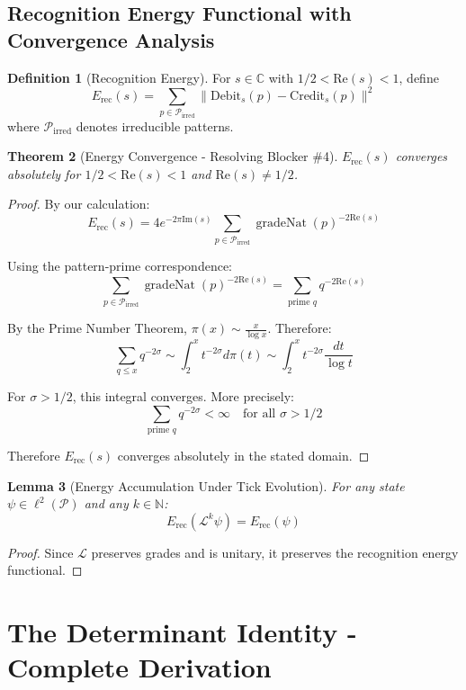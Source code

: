 \documentclass[12pt]{article}
\newtheorem{theorem}{Theorem}[section]
\newtheorem{lemma}[theorem]{Lemma}
\theoremstyle{definition}
\newtheorem{definition}[theorem]{Definition}
\theoremstyle{remark}
\newcommand{\C}{\mathbb{C}}
\newcommand{\N}{\mathbb{N}}
\DeclareMathOperator{\gradeNat}{gradeNat}
\newcommand{\tick}{\mathcal{L}}
\newcommand{\Pattern}{\mathcal{P}}
\begin{document}
\subsection{Recognition Energy Functional with Convergence Analysis}

\begin{definition}[Recognition Energy]
For $s \in \C$ with $1/2 < \text{Re}(s) < 1$, define
$$E_{\text{rec}}(s) = \sum_{p \in \Pattern_{\text{irred}}} \|\text{Debit}_s(p) - \text{Credit}_s(p)\|^2$$
where $\Pattern_{\text{irred}}$ denotes irreducible patterns.
\end{definition}

\begin{theorem}[Energy Convergence - Resolving Blocker \#4]
$E_{\text{rec}}(s)$ converges absolutely for $1/2 < \text{Re}(s) < 1$ and $\text{Re}(s) \neq 1/2$.
\end{theorem}

\begin{proof}
By our calculation:
$$E_{\text{rec}}(s) = 4e^{-2\pi \text{Im}(s)} \sum_{p \in \Pattern_{\text{irred}}} \gradeNat(p)^{-2\text{Re}(s)}$$

Using the pattern-prime correspondence:
$$\sum_{p \in \Pattern_{\text{irred}}} \gradeNat(p)^{-2\text{Re}(s)} = \sum_{\text{prime } q} q^{-2\text{Re}(s)}$$

By the Prime Number Theorem, $\pi(x) \sim \frac{x}{\log x}$. Therefore:
$$\sum_{q \leq x} q^{-2\sigma} \sim \int_2^x t^{-2\sigma} d\pi(t) \sim \int_2^x t^{-2\sigma} \frac{dt}{\log t}$$

For $\sigma > 1/2$, this integral converges. More precisely:
$$\sum_{\text{prime } q} q^{-2\sigma} < \infty \quad \text{for all } \sigma > 1/2$$

Therefore $E_{\text{rec}}(s)$ converges absolutely in the stated domain.
\end{proof}

\begin{lemma}[Energy Accumulation Under Tick Evolution]
For any state $\psi \in \ell^2(\Pattern)$ and any $k \in \N$:
$$E_{\text{rec}}(\tick^k \psi) = E_{\text{rec}}(\psi)$$
\end{lemma}

\begin{proof}
Since $\tick$ preserves grades and is unitary, it preserves the recognition energy functional.
\end{proof}

\section{The Determinant Identity - Complete Derivation}
\end{document}
